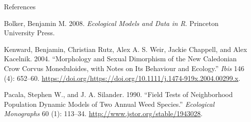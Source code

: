 \documentclass[
  ignorenonframetext,
]{beamer}
\begin{document}
\begin{frame}{References}
\protect\hypertarget{references}{}

\hypertarget{refs}{}
\leavevmode\hypertarget{ref-bolker}{}%
Bolker, Benjamin M. 2008. \emph{Ecological Models and Data in R}.
Princeton University Press.

\leavevmode\hypertarget{ref-krwck}{}%
Kenward, Benjamin, Christian Rutz, Alex A. S. Weir, Jackie Chappell, and
Alex Kacelnik. 2004. ``Morphology and Sexual Dimorphism of the New
Caledonian Crow Corvus Moneduloides, with Notes on Its Behaviour and
Ecology.'' \emph{Ibis} 146 (4): 652--60.
\url{https://doi.org/https://doi.org/10.1111/j.1474-919x.2004.00299.x}.

\leavevmode\hypertarget{ref-pacsil}{}%
Pacala, Stephen W., and J. A. Silander. 1990. ``Field Tests of
Neighborhood Population Dynamic Models of Two Annual Weed Species.''
\emph{Ecological Monographs} 60 (1): 113--34.
\url{http://www.jstor.org/stable/1943028}.

\end{frame}
\end{document}
